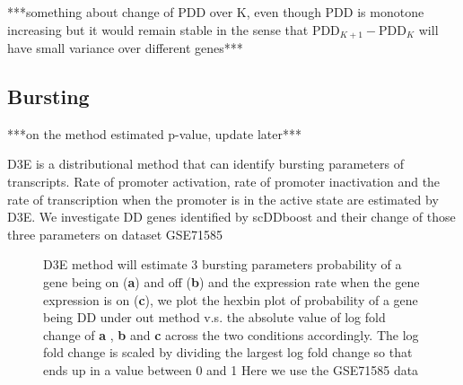 \documentclass[aoas,preprint]{imsart}
\begin{document}
***something about change of PDD over K, even though PDD is monotone increasing but it would remain stable in the sense that $\text{PDD}_{K+1} - \text{PDD}_K$ will have small variance over different genes***



\subsection{Bursting}

***on the method estimated p-value, update later***

D3E\citep{ref:d3e} is a distributional method that can identify bursting parameters of transcripts. Rate of promoter activation, rate of promoter inactivation and the rate of transcription when the promoter is in the active state are estimated by D3E.  We investigate DD genes identified by scDDboost and their change of those three parameters on dataset GSE71585\\

\begin{figure}[H]
\caption{D3E method will estimate 3 bursting parameters probability of a gene being on (\textbf{a}) and off (\textbf{b}) and the expression rate when the gene expression is on (\textbf{c}), we plot the hexbin plot of probability of a gene being DD under out method v.s. the absolute value of log fold change of \textbf{a} , \textbf{b} and \textbf{c}  across the two conditions accordingly. The log fold change is scaled by dividing the largest log fold change so that ends up in a value between 0 and 1 Here we use the GSE71585 data }
\end{figure}
\end{document}
